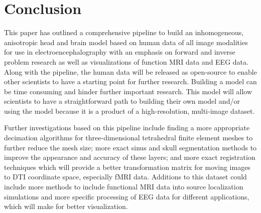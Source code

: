 %
%

\section{Conclusion}
\label{sec:Conclusion}

This paper has outlined a comprehensive pipeline to build an inhomogeneous, anisotropic head and brain model based on human data of all image modalities for use in electroencephalography with an emphasis on forward and inverse problem research as well as visualizations of function MRI data and EEG data. Along with the pipeline, the human data will be released as open-source to enable other scientists to have a starting point for further research. Building a model can be time consuming and hinder further important research. This model will allow scientists to have a straightforward path to building their own model and/or using the model because it is a product of a high-resolution, multi-image dataset.

Further investigations based on this pipeline include finding a more appropriate decimation algorithms for three-dimensional tetrahedral finite element meshes to further reduce the mesh size; more exact sinus and skull segmentation methods to improve the appearance and accuracy of these layers; and more exact registration techniques which will provide a better transformation matrix for moving images to DTI coordinate space, especially fMRI data. Additions to this dataset could include more methods to include functional MRI data into source localization simulations and more specific processing of EEG data for different applications, which will make for better visualization. 